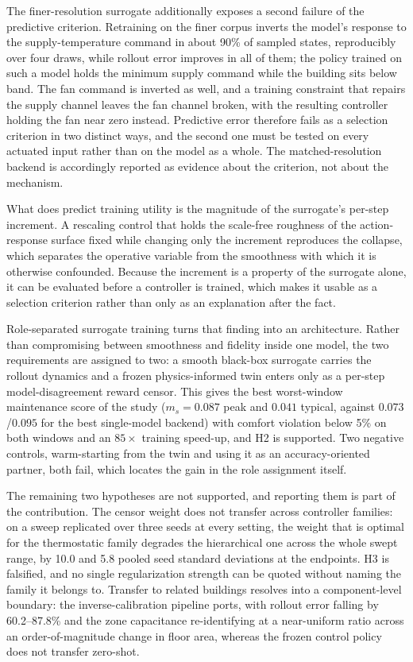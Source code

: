 \documentclass{ieeeaccess}
\newcommand{\ms}{\ensuremath{m_s}}
\begin{document}
The finer-resolution surrogate additionally exposes a second failure of the
predictive criterion. Retraining on the finer corpus inverts the model's
response to the supply-temperature command in about 90\% of sampled states,
reproducibly over four draws, while rollout error improves in all of them; the
policy trained on such a model holds the minimum supply command while the
building sits below band. The fan command is inverted as well, and a training
constraint that repairs the supply channel leaves the fan channel broken, with
the resulting controller holding the fan near zero instead. Predictive error
therefore fails as a selection criterion in two distinct ways, and the second
one must be tested on every actuated input rather than on the model as a whole.
The matched-resolution backend is accordingly reported as evidence about the
criterion, not about the mechanism.

What does predict training utility is the magnitude of the surrogate's per-step
increment. A rescaling control that holds the scale-free roughness of the
action-response surface fixed while changing only the increment reproduces the
collapse, which separates the operative variable from the smoothness with which
it is otherwise confounded. Because the increment is a property of the surrogate
alone, it can be evaluated before a controller is trained, which makes it usable
as a selection criterion rather than only as an explanation after the fact.

Role-separated surrogate training turns that finding into an architecture.
Rather than compromising between smoothness and fidelity inside one model, the
two requirements are assigned to two: a smooth black-box surrogate carries the
rollout dynamics and a frozen physics-informed twin enters only as a per-step
model-disagreement reward censor. This gives the best worst-window maintenance
score of the study ($\ms=0.087$ peak and $0.041$ typical, against
$0.073$/$0.095$ for the best single-model backend) with comfort violation below
5\% on both windows and an $85\times$ training speed-up, and H2 is supported.
Two negative controls, warm-starting from the twin and using it as an
accuracy-oriented partner, both fail, which locates the gain in the role
assignment itself.

The remaining two hypotheses are not supported, and reporting them is part of
the contribution. The censor weight does not transfer across controller
families: on a sweep replicated over three seeds at every setting, the weight
that is optimal for the thermostatic family degrades the hierarchical one across
the whole swept range, by 10.0 and 5.8 pooled seed standard deviations at the
endpoints. H3 is falsified, and no single regularization strength can be quoted
without naming the family it belongs to. Transfer to related buildings resolves
into a component-level boundary: the inverse-calibration pipeline ports, with
rollout error falling by 60.2--87.8\% and the zone capacitance re-identifying at
a near-uniform ratio across an order-of-magnitude change in floor area, whereas
the frozen control policy does not transfer zero-shot.
\end{document}
